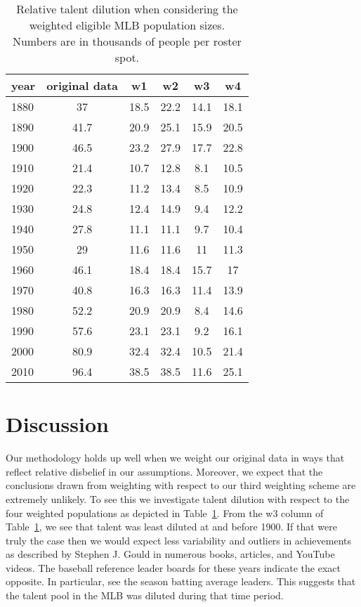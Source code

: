 \documentclass[11pt]{article}\usepackage[]{graphicx}\usepackage[]{color}
\begin{document}
\begin{table}[h!]
\begin{center}
\begin{tabular}{lccccc}
\hline
year & original data & w1 & w2 & w3 & w4 \\
\hline
1880 & 37   
  & 18.5   
  & 22.2   
  & 14.1 
  & 18.1   \\
1890 & 41.7   
  & 20.9   
  & 25.1   
  & 15.9 
  & 20.5   \\
1900 & 46.5   
  & 23.2   
  & 27.9   
  & 17.7 
  & 22.8   \\
1910 & 21.4   
  & 10.7   
  & 12.8   
  & 8.1 
  & 10.5   \\
1920 & 22.3   
  & 11.2   
  & 13.4   
  & 8.5 
  & 10.9   \\ 
1930 & 24.8  
  & 12.4  
  & 14.9  
  & 9.4
  & 12.2  \\
1940 & 27.8  
  & 11.1  
  & 11.1  
  & 9.7
  & 10.4  \\
1950 & 29  
  & 11.6  
  & 11.6  
  & 11
  & 11.3  \\
1960 & 46.1  
  & 18.4  
  & 18.4  
  & 15.7
  & 17  \\  
1970 & 40.8  
  & 16.3  
  & 16.3  
  & 11.4
  & 13.9  \\   
1980 & 52.2 
  & 20.9 
  & 20.9 
  & 8.4
  & 14.6 \\
1990 & 57.6 
  & 23.1 
  & 23.1 
  & 9.2
  & 16.1 \\  
2000 & 80.9 
  & 32.4 
  & 32.4 
  & 10.5
  & 21.4 \\
2010 & 96.4 
  & 38.5 
  & 38.5 
  & 11.6
  & 25.1 \\
\hline
\end{tabular}
\end{center}
\caption{Relative talent dilution when considering the weighted eligible MLB 
  population sizes. Numbers are in thousands of people per roster spot. }
\label{dilution2}
\end{table}




\section{Discussion}

Our methodology holds up well when we weight our original data in ways that 
reflect relative disbelief in our assumptions.  Moreover, we expect that the 
conclusions drawn from weighting with respect to our third weighting scheme 
are extremely unlikely.  To see this we investigate talent dilution with 
respect to the four weighted populations as depicted in 
Table~\ref{dilution2}.  From the w3 column of Table~\ref{dilution2}, we see 
that talent was least diluted at and before 1900.  If that were truly the 
case then we would expect less variability and outliers in achievements 
as described by Stephen J. Gould in numerous books, articles, and YouTube 
videos.  The baseball reference leader boards for these years 
indicate the exact opposite. In particular, see the season batting average 
leaders. %
This suggests that the talent pool in the MLB was diluted during that 
time period.  
\end{document}
